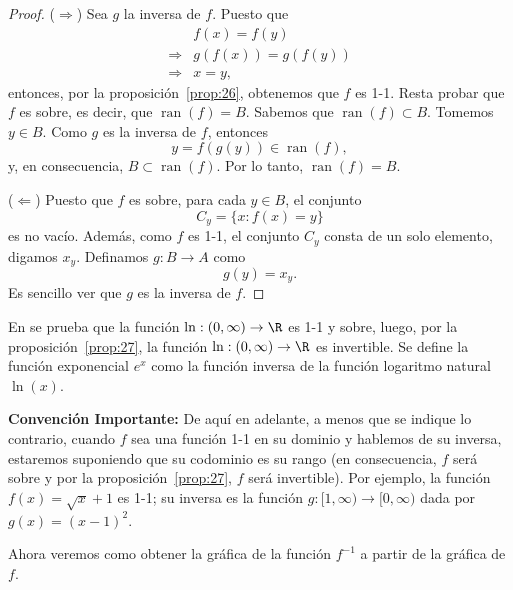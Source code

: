 \documentclass[12pt,a4paper]{book}
\DeclareMathOperator{\ran}{ran}
\begin{document}
    \begin{proof}
        ($\Rightarrow$) Sea $g$ la inversa de $f$. Puesto que
        \begin{align*}
            &f(x)=f(y)\\
            \Rightarrow{}& g(f(x))=g(f(y))\\
            \Rightarrow{}& x=y,
        \end{align*}
        entonces, por la proposición~\ref{prop:26}, obtenemos que $f$ es 1-1. Resta probar que
        $f$ es sobre, es decir, que $\ran(f)=B$. Sabemos que $\ran(f)\subset B$. Tomemos
        $y\in B$. Como $g$ es la inversa de $f$, entonces
        \begin{equation*}
            y=f(g(y))\in\ran(f),
        \end{equation*}
        y, en consecuencia, $B\subset\ran(f)$. Por lo tanto, $\ran(f)=B$.

        ($\Leftarrow$) Puesto que $f$ es sobre, para cada $y\in B$, el conjunto
        \begin{equation*}
            C_{y}=\{x:f(x)=y\}
        \end{equation*}
        es no vacío. Además, como $f$ es 1-1, el conjunto $C_{y}$ consta de un solo elemento,
        digamos $x_{y}$. Definamos $g:B\to A$ como
        \begin{equation*}
            g(y)=x_{y}.
        \end{equation*}
        Es sencillo ver que $g$ es la inversa de $f$.
    \end{proof}

    En \cite{nunez2020calculoII} se prueba que la función $\ln:(0,\infty)\to\R$ es 1-1 y sobre, luego, por la
    proposición~\ref{prop:27}, la función $\ln:(0,\infty)\to\R$ es invertible. Se define la función
    exponencial $e^{x}$ como la función inversa de la función logaritmo natural $\ln(x)$.

    \textbf{Convención Importante:} De aquí en adelante, a menos que se indique
    lo contrario, cuando $f$ sea una función 1-1 en su dominio y hablemos de su
    inversa, estaremos suponiendo que su codominio es su rango (en consecuencia,
    $f$ será sobre y por la proposición~\ref{prop:27}, $f$ será invertible). Por ejemplo, la función
    $f(x)=\sqrt{x}+1$ es 1-1; su inversa es la función $g:[1,\infty)\to[0,\infty)$ dada por
    $g(x)=(x-1)^{2}$.

    Ahora veremos como obtener la gráfica de la función $f^{-1}$ a partir de la
    gráfica de $f$.
\end{document}

